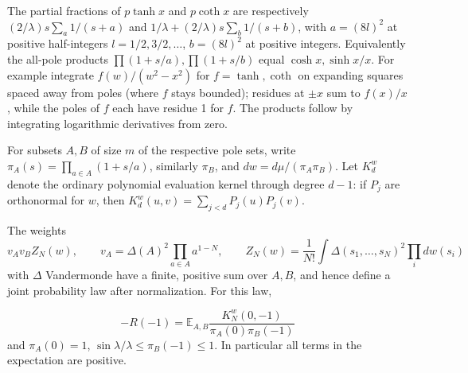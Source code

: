 The partial fractions of \(p\tanh x\) and \(p\coth x\) are respectively \((2/\lambda)s\sum_{a}1/(s+a)\) and \(1/\lambda+(2/\lambda)s\sum_b1/(s+b)\), with \(a=(8l)^2\) at positive half-integers \(l=1/2,3/2,\ldots\), \(b=(8l)^2\) at positive integers. Equivalently the all-pole products \(\prod(1+s/a),\prod(1+s/b)\) equal \(\cosh x,\sinh x/x\). For example integrate \(f(w)/(w^2-x^2)\) for \(f=\tanh,\coth\) on expanding squares spaced away from poles (where \(f\) stays bounded); residues at \(\pm x\) sum to \(f(x)/x\), while the poles of \(f\) each have residue 1 for \(f\). The products follow by integrating logarithmic derivatives from zero.

For subsets \(A,B\) of size \(m\) of the respective pole sets, write \(\pi_A(s)=\prod_{a\in A}(1+s/a)\), similarly \(\pi_B\), and \(dw=d\mu/(\pi_A\pi_B)\). Let \(K_d^w\) denote the ordinary polynomial evaluation kernel through degree \(d-1\): if \(P_j\) are orthonormal for \(w\), then \(K_d^w(u,v)=\sum_{j<d}P_j(u)P_j(v)\).

\begin{lemma}\label{lem:pv:pole-representation}
The weights
\[
 v_A v_B Z_N(w),\qquad v_A=\Delta(A)^2\prod_{a\in A} a^{1-N},\qquad
 Z_N(w)=\frac1{N!}\int\Delta(s_1,\ldots,s_N)^2\prod_i dw(s_i)
\]
with \(\Delta\) Vandermonde have a finite, positive sum over \(A,B\), and hence define a joint probability law after normalization. For this law,
\begin{samepage}
\begin{equation}\label{eq:pv:pole-representation}
 -R(-1)=\mathbb E_{A,B}\frac{K_N^w(0,-1)}{\pi_A(0)\pi_B(-1)}
\end{equation}
and \(\pi_A(0)=1\), \(\sin\lambda/\lambda\le\pi_B(-1)\le1\). In particular all terms in the expectation are positive.
\par
\end{samepage}
\end{lemma}

